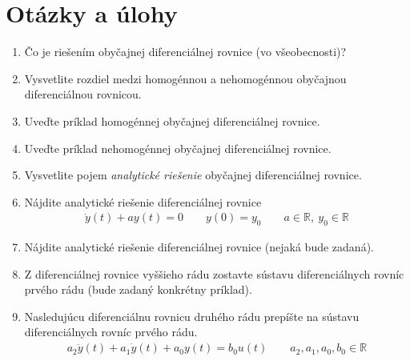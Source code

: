 \documentclass[a4paper, 10pt, ]{article}
\begin{document}
\section{Otázky a úlohy}

\begin{enumerate}[leftmargin=0pt, labelsep=3mm, itemsep=0pt]
    
    \item Čo je riešením obyčajnej diferenciálnej rovnice (vo všeobecnosti)?

    \item Vysvetlite rozdiel medzi homogénnou a nehomogénnou obyčajnou diferenciálnou rovnicou.

    \item Uveďte príklad homogénnej obyčajnej diferenciálnej rovnice.

    \item Uveďte príklad nehomogénnej obyčajnej diferenciálnej rovnice.

    \item Vysvetlite pojem \emph{analytické riešenie} obyčajnej diferenciálnej rovnice.
    
    \item Nájdite analytické riešenie diferenciálnej rovnice
    \begin{align*}
        \dot y(t) + a y(t) = 0 \qquad y(0) = y_0 \qquad a\in\mathbb R,\ y_0\in\mathbb R
    \end{align*}    

	\item Nájdite analytické riešenie diferenciálnej rovnice (nejaká bude zadaná).
	
    \item Z diferenciálnej rovnice vyššieho rádu zostavte sústavu diferenciálnych rovníc prvého rádu (bude zadaný konkrétny príklad).
    
    \item Nasledujúcu diferenciálnu rovnicu druhého rádu prepíšte na sústavu diferenciálnych rovníc prvého rádu.
    \begin{align*}
        a_2 \ddot y(t) + a_1 \dot y(t) + a_0 y(t) = b_0 u(t) \qquad a_2, a_1, a_0, b_0 \in\mathbb R
    \end{align*}


\end{enumerate}














\printbibliography[title={Literatúra}]
\end{document}
